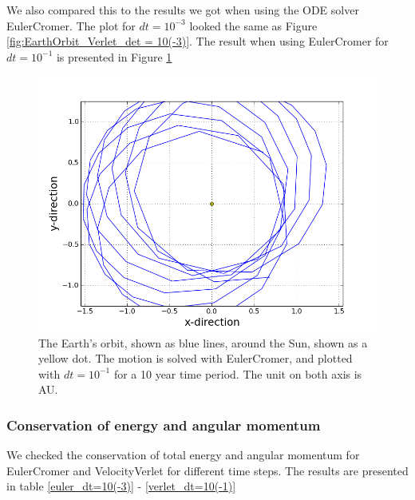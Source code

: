 \documentclass[norsk,a4paper,12pt]{article}
\begin{document}
{We also compared this to the results we got when using the ODE solver EulerCromer. The plot for $dt=10^{-3}$ looked the same as Figure \ref{fig:EarthOrbit_Verlet_det = 10(-3)}. The result when using EulerCromer for $dt=10^{-1}$ is presented in Figure \ref{fig:oppg_3c_sun_earth_euler_dt=10(-1)}

\begin{figure} [H]
    \centering
    \includegraphics[scale=0.6]{oppg_3c_sun_earth_euler_dt=10(-1)}
    \caption{The Earth's orbit, shown as blue lines, around the Sun, shown as a yellow dot. The motion is solved with EulerCromer, and plotted with $dt = 10^{-1}$ for a 10 year time period. The unit on both axis is AU.}
    \label{fig:oppg_3c_sun_earth_euler_dt=10(-1)}
\end{figure}

\subsubsection{Conservation of energy and angular momentum}
We checked the conservation of total energy and angular momentum for EulerCromer and VelocityVerlet for different time steps. The results are presented in table \ref{euler_dt=10(-3)} - \ref{verlet_dt=10(-1)}
\par
\vspace{3mm}

}
\end{document}
